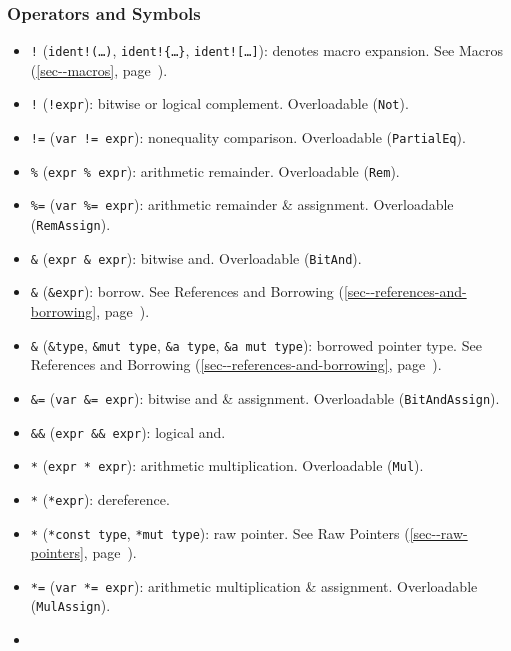 \documentclass[a4paper,]{book}
\renewcommand*{\hyperlink}[2]{%
 #2 (\autoref{#1}, page~\pageref{#1})}
\providecommand{\tightlist}{%
  \setlength{\itemsep}{0pt}\setlength{\parskip}{0pt}}
\begin{document}
\subsubsection{Operators and Symbols}\label{operators-and-symbols}

\begin{itemize}
\tightlist
\item
  \texttt{!} (\texttt{ident!(\ldots{})}, \texttt{ident!\{\ldots{}\}},
  \texttt{ident!{[}\ldots{}{]}}): denotes macro expansion. See
  \protect\hyperlink{sec--macros}{Macros}.
\item
  \texttt{!} (\texttt{!expr}): bitwise or logical complement.
  Overloadable (\texttt{Not}).
\item
  \texttt{!=} (\texttt{var\ !=\ expr}): nonequality comparison.
  Overloadable (\texttt{PartialEq}).
\item
  \texttt{\%} (\texttt{expr\ \%\ expr}): arithmetic remainder.
  Overloadable (\texttt{Rem}).
\item
  \texttt{\%=} (\texttt{var\ \%=\ expr}): arithmetic remainder \&
  assignment. Overloadable (\texttt{RemAssign}).
\item
  \texttt{\&} (\texttt{expr\ \&\ expr}): bitwise and. Overloadable
  (\texttt{BitAnd}).
\item
  \texttt{\&} (\texttt{\&expr}): borrow. See
  \protect\hyperlink{sec--references-and-borrowing}{References and
  Borrowing}.
\item
  \texttt{\&} (\texttt{\&type}, \texttt{\&mut\ type},
  \texttt{\&\textquotesingle{}a\ type},
  \texttt{\&\textquotesingle{}a\ mut\ type}): borrowed pointer type. See
  \protect\hyperlink{sec--references-and-borrowing}{References and
  Borrowing}.
\item
  \texttt{\&=} (\texttt{var\ \&=\ expr}): bitwise and \& assignment.
  Overloadable (\texttt{BitAndAssign}).
\item
  \texttt{\&\&} (\texttt{expr\ \&\&\ expr}): logical and.
\item
  \texttt{*} (\texttt{expr\ *\ expr}): arithmetic multiplication.
  Overloadable (\texttt{Mul}).
\item
  \texttt{*} (\texttt{*expr}): dereference.
\item
  \texttt{*} (\texttt{*const\ type}, \texttt{*mut\ type}): raw pointer.
  See \protect\hyperlink{sec--raw-pointers}{Raw Pointers}.
\item
  \texttt{*=} (\texttt{var\ *=\ expr}): arithmetic multiplication \&
  assignment. Overloadable (\texttt{MulAssign}).
\item

\end{itemize}
\end{document}
